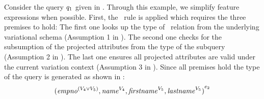 \begin{example}
\label{eg:type}
Consider the query \ensuremath{\vQ_1} given in .
Through this example, we simplify feature expressions when possible.
First, the \prjE\ rule is applied which requires the three premises to 
hold:
The first one looks up the type of \empbio\ relation from the underlying
variational schema (Assumption 1 in ). The second one 
checks for the subsumption of the projected attributes from the type of 
the subquery (Assumption 2 in ). The last one ensures
all projected attributes are valid under the current variation context
(Assumption 3 in ). Since all premises hold the type of
the query is generated as shown in :
\[
\annot [\dimMeta_2] {( \annot [(\vFour \vee \vFive) ] \empno, \annot [\vFour] \name, \annot [\vFive] \fname, \annot [\vFive] \lname)} 
\]


\end{example}
